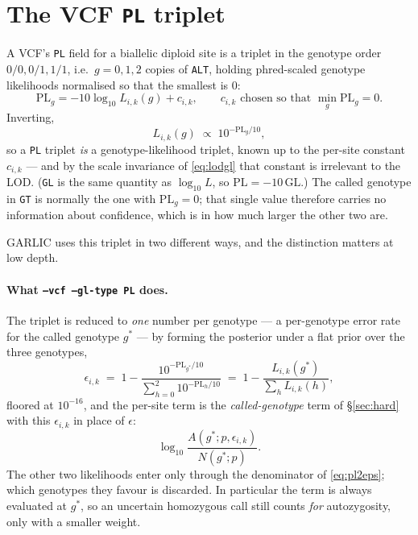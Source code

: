 \documentclass[11pt]{article}
\newcommand{\code}[1]{\texttt{#1}}
\begin{document}
\section{The VCF \code{PL} triplet}
\label{sec:pl}

A VCF's \code{PL} field for a biallelic diploid site is a triplet in the genotype order $0/0, 0/1, 1/1$, i.e.\ $g = 0, 1, 2$ copies of \code{ALT}, holding phred-scaled genotype likelihoods normalised so that the smallest is $0$:
\begin{equation}
\mathrm{PL}_g = -10 \log_{10} L_{i,k}(g) + c_{i,k}, \qquad c_{i,k} \text{ chosen so that } \min_g \mathrm{PL}_g = 0 .
\end{equation}
Inverting,
\begin{equation}
L_{i,k}(g) \;\propto\; 10^{-\mathrm{PL}_g / 10},
\label{eq:pl2l}
\end{equation}
so a \code{PL} triplet \emph{is} a genotype-likelihood triplet, known up to the per-site constant $c_{i,k}$ --- and by the scale invariance of \eqref{eq:lodgl} that constant is irrelevant to the LOD. (\code{GL} is the same quantity as $\log_{10} L$, so $\mathrm{PL} = -10\,\mathrm{GL}$.) The called genotype in \code{GT} is normally the one with $\mathrm{PL}_g = 0$; that single value therefore carries no information about confidence, which is in how much larger the other two are.

GARLIC uses this triplet in two different ways, and the distinction matters at low depth.

\paragraph{What \code{--vcf --gl-type PL} does.} The triplet is reduced to \emph{one} number per genotype --- a per-genotype error rate for the called genotype $g^\ast$ --- by forming the posterior under a flat prior over the three genotypes,
\begin{equation}
\epsilon_{i,k} \;=\; 1 - \frac{10^{-\mathrm{PL}_{g^\ast}/10}}{\sum_{h=0}^{2} 10^{-\mathrm{PL}_h/10}} \;=\; 1 - \frac{L_{i,k}(g^\ast)}{\sum_h L_{i,k}(h)},
\label{eq:pl2eps}
\end{equation}
floored at $10^{-16}$, and the per-site term is the \emph{called-genotype} term of \S\ref{sec:hard} with this $\epsilon_{i,k}$ in place of $\epsilon$:
\begin{equation}
\log_{10} \frac{A(g^\ast; p, \epsilon_{i,k})}{N(g^\ast; p)} .
\label{eq:plterm}
\end{equation}
The other two likelihoods enter only through the denominator of \eqref{eq:pl2eps}; which genotypes they favour is discarded. In particular the term is always evaluated at $g^\ast$, so an uncertain homozygous call still counts \emph{for} autozygosity, only with a smaller weight.
\end{document}
